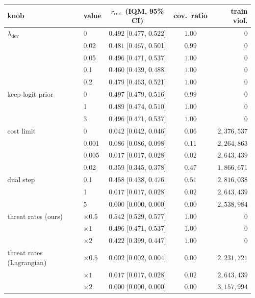 \begin{tabular}{@{}llccr@{}}
\toprule
knob & value & $r_{\mathrm{cert}}$ (IQM, 95\% CI) & cov.\ ratio & train viol.\\
\midrule
$\lambda_{\mathrm{dev}}$ & 0 & $0.492$ {\scriptsize[0.477, 0.522]} & $1.00$ & $0$ \\
 & 0.02 & $0.481$ {\scriptsize[0.467, 0.501]} & $0.99$ & $0$ \\
 & 0.05 & $0.496$ {\scriptsize[0.471, 0.537]} & $1.00$ & $0$ \\
 & 0.1 & $0.460$ {\scriptsize[0.439, 0.488]} & $1.00$ & $0$ \\
 & 0.2 & $0.479$ {\scriptsize[0.463, 0.521]} & $1.00$ & $0$ \\
\midrule
keep-logit prior & 0 & $0.497$ {\scriptsize[0.479, 0.516]} & $0.99$ & $0$ \\
 & 1 & $0.489$ {\scriptsize[0.474, 0.510]} & $1.00$ & $0$ \\
 & 3 & $0.496$ {\scriptsize[0.471, 0.537]} & $1.00$ & $0$ \\
\midrule
cost limit & 0 & $0.042$ {\scriptsize[0.042, 0.046]} & $0.06$ & $2{,}376{,}537$ \\
 & 0.001 & $0.086$ {\scriptsize[0.086, 0.098]} & $0.11$ & $2{,}264{,}863$ \\
 & 0.005 & $0.017$ {\scriptsize[0.017, 0.028]} & $0.02$ & $2{,}643{,}439$ \\
 & 0.02 & $0.359$ {\scriptsize[0.345, 0.378]} & $0.47$ & $1{,}866{,}671$ \\
\midrule
dual step & 0.1 & $0.458$ {\scriptsize[0.438, 0.476]} & $0.51$ & $2{,}816{,}038$ \\
 & 1 & $0.017$ {\scriptsize[0.017, 0.028]} & $0.02$ & $2{,}643{,}439$ \\
 & 5 & $0.000$ {\scriptsize[0.000, 0.000]} & $0.00$ & $2{,}538{,}984$ \\
\midrule
threat rates (ours) & $\times0.5$ & $0.542$ {\scriptsize[0.529, 0.577]} & $1.00$ & $0$ \\
 & $\times1$ & $0.496$ {\scriptsize[0.471, 0.537]} & $1.00$ & $0$ \\
 & $\times2$ & $0.422$ {\scriptsize[0.399, 0.447]} & $1.00$ & $0$ \\
\midrule
threat rates (Lagrangian) & $\times0.5$ & $0.002$ {\scriptsize[0.002, 0.004]} & $0.00$ & $2{,}231{,}721$ \\
 & $\times1$ & $0.017$ {\scriptsize[0.017, 0.028]} & $0.02$ & $2{,}643{,}439$ \\
 & $\times2$ & $0.000$ {\scriptsize[0.000, 0.000]} & $0.00$ & $3{,}157{,}994$ \\
\bottomrule
\end{tabular}
